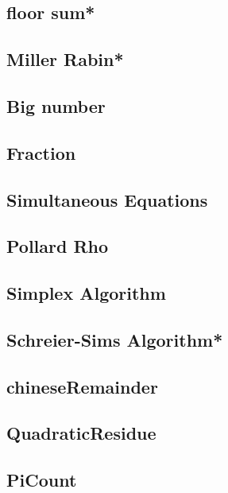 \subsection{floor sum*} %

\subsection{Miller Rabin*} %

\subsection{Big number}

\subsection{Fraction}

\subsection{Simultaneous Equations}

\subsection{Pollard Rho}

\subsection{Simplex Algorithm}

\subsection{Schreier-Sims Algorithm*} %

\subsection{chineseRemainder}

\subsection{QuadraticResidue}

\subsection{PiCount}

